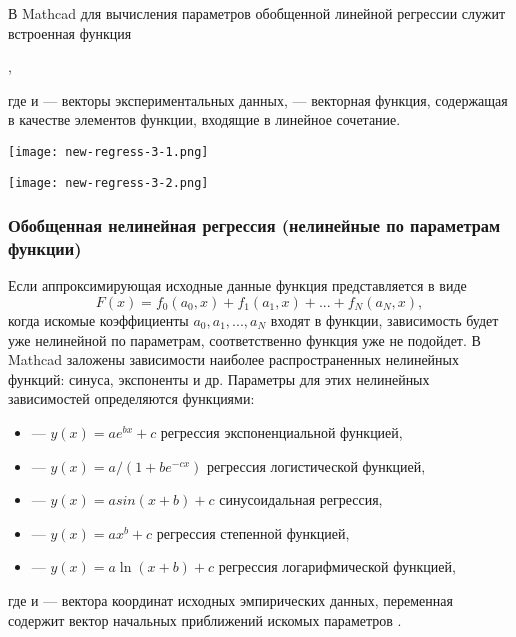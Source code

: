 В Mathcad для вычисления параметров обобщенной линейной регрессии служит встроенная функция 
\begin{center}
,
\end{center}
 где  и  --- векторы экспериментальных данных,  --- векторная функция, содержащая в качестве элементов функции, входящие в линейное сочетание.


\begin{center}
	\texttt{[image: new-regress-3-1.png]}
\end{center}
\begin{center}
	\texttt{[image: new-regress-3-2.png]}
\end{center}


\subsubsection{Обобщенная нелинейная регрессия (нелинейные по параметрам функции)}

Если аппроксимирующая исходные данные функция представляется в виде 
\begin{equation}
F(x) = f_0 (a_0, x) + f_1(a_1,x) +... + f_N(a_N,x),
\end{equation}
 когда искомые коэффициенты $a_0, a_1, ..., a_N$ входят в функции, зависимость будет уже нелинейной по параметрам, соответственно функция  уже не подойдет.
В Mathcad заложены зависимости наиболее распространенных нелинейных функций: синуса, экспоненты и др. Параметры для этих нелинейных зависимостей определяются функциями: 
\begin{itemize}
	\item {} --- $y(x)=a e^{b x}+c$ регрессия  экспоненциальной функцией,
	\item {} --- $y(x)=a/(1+b e^{-c x})$ регрессия логистической функцией,
	\item {} --- $y(x)=a sin(x+b)+c$ синусоидальная регрессия,
	\item {} --- $y(x)=a x^b+c$ регрессия степенной функцией,
	\item {} --- $y(x)=a\ln(x+b)+c$ регрессия логарифмической функцией,
\end{itemize}
где  и  --- вектора координат исходных эмпирических данных, переменная  содержит вектор начальных приближений искомых параметров .


